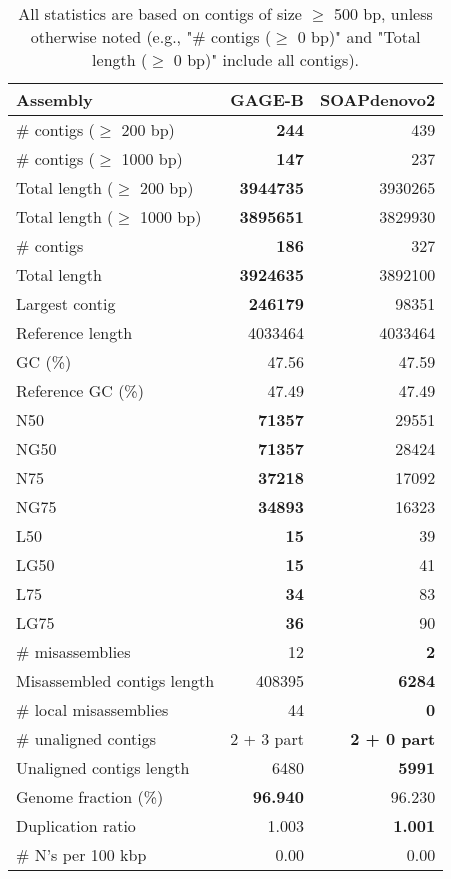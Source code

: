 \documentclass[12pt,a4paper]{article}
\begin{document}
\begin{table}[ht]
\begin{center}
\caption{All statistics are based on contigs of size $\geq$ 500 bp, unless otherwise noted (e.g., "\# contigs ($\geq$ 0 bp)" and "Total length ($\geq$ 0 bp)" include all contigs).}
\begin{tabular}{|l*{2}{|r}|}
\hline
Assembly & GAGE-B & SOAPdenovo2 \\ \hline
\# contigs ($\geq$ 200 bp) & {\bf 244} & 439 \\ \hline
\# contigs ($\geq$ 1000 bp) & {\bf 147} & 237 \\ \hline
Total length ($\geq$ 200 bp) & {\bf 3944735} & 3930265 \\ \hline
Total length ($\geq$ 1000 bp) & {\bf 3895651} & 3829930 \\ \hline
\# contigs & {\bf 186} & 327 \\ \hline
Total length & {\bf 3924635} & 3892100 \\ \hline
Largest contig & {\bf 246179} & 98351 \\ \hline
Reference length & 4033464 & 4033464 \\ \hline
GC (\%) & 47.56 & 47.59 \\ \hline
Reference GC (\%) & 47.49 & 47.49 \\ \hline
N50 & {\bf 71357} & 29551 \\ \hline
NG50 & {\bf 71357} & 28424 \\ \hline
N75 & {\bf 37218} & 17092 \\ \hline
NG75 & {\bf 34893} & 16323 \\ \hline
L50 & {\bf 15} & 39 \\ \hline
LG50 & {\bf 15} & 41 \\ \hline
L75 & {\bf 34} & 83 \\ \hline
LG75 & {\bf 36} & 90 \\ \hline
\# misassemblies & 12 & {\bf 2} \\ \hline
Misassembled contigs length & 408395 & {\bf 6284} \\ \hline
\# local misassemblies & 44 & {\bf 0} \\ \hline
\# unaligned contigs & 2 + 3 part & {\bf 2 + 0 part} \\ \hline
Unaligned contigs length & 6480 & {\bf 5991} \\ \hline
Genome fraction (\%) & {\bf 96.940} & 96.230 \\ \hline
Duplication ratio & 1.003 & {\bf 1.001} \\ \hline
\# N's per 100 kbp & 0.00 & 0.00 \\ \hline

\end{tabular}
\end{center}
\end{table}
\end{document}
